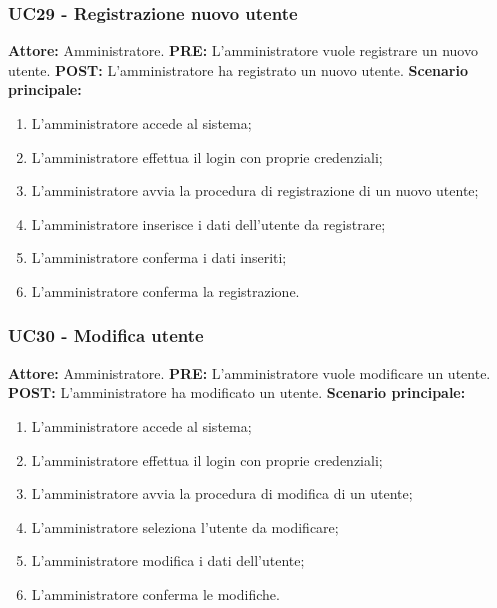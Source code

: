 \documentclass[a4paper, 12pt]{article}
\begin{document}
\subsubsection{UC29 - Registrazione nuovo utente}
\textbf{Attore: } Amministratore.\newline
\textbf{PRE: } L'amministratore vuole registrare un nuovo utente.\newline
\textbf{POST: } L'amministratore ha registrato un nuovo utente.\newline
\textbf{Scenario principale: }
\begin{enumerate}
    \item L'amministratore accede al sistema;
    \item L'amministratore effettua il login con proprie credenziali;
    \item L'amministratore avvia la procedura di registrazione di un nuovo utente;
    \item L'amministratore inserisce i dati dell'utente da registrare;
    \item L'amministratore conferma i dati inseriti;
    \item L'amministratore conferma la registrazione.
\end{enumerate}

\subsubsection{UC30 - Modifica utente}
\textbf{Attore: } Amministratore.\newline
\textbf{PRE: } L'amministratore vuole modificare un utente.\newline
\textbf{POST: } L'amministratore ha modificato un utente.\newline
\textbf{Scenario principale: }
\begin{enumerate}
    \item L'amministratore accede al sistema;
    \item L'amministratore effettua il login con proprie credenziali;
    \item L'amministratore avvia la procedura di modifica di un utente;
    \item L'amministratore seleziona l'utente da modificare;
    \item L'amministratore modifica i dati dell'utente;
    \item L'amministratore conferma le modifiche.
\end{enumerate}
\end{document}
